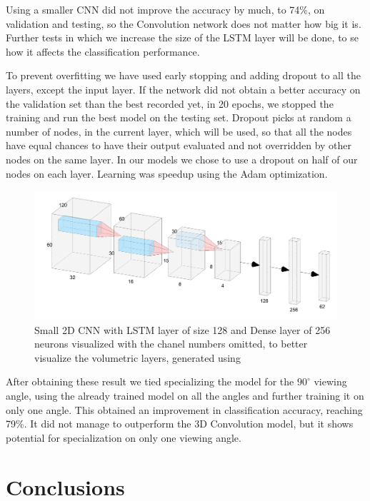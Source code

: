 \documentclass[12pt]{article}
\theoremstyle{definition}
\begin{document}
	Using a smaller CNN did not improve the accuracy by much, to 74\%, on validation and testing, so the Convolution network does not matter how big it is. Further tests in which we increase the size of the LSTM layer will be done, to se how it affects the classification performance.

	To prevent overfitting we have used early stopping and adding dropout to all the layers, except the input layer. If the network did not obtain a better accuracy on the validation set than the best recorded yet, in 20 epochs, we stopped the training and run the best model on the testing set. Dropout picks at random a number of nodes, in the current layer, which will be used, so that all the nodes have equal chances to have their output evaluated and not overridden by other nodes on the same layer. In our models we chose to use a dropout on half of our nodes on each layer. Learning was speedup using the Adam optimization.

	\begin{figure}[ht]
		\includegraphics[width=\textwidth]{networks/small-2D-CNN-LSTM-Dense.png}
		\caption{Small 2D CNN with LSTM layer of size 128 and Dense layer of 256 neurons visualized with the chanel numbers omitted, to better visualize the volumetric layers, generated using \cite{nn-svg}}
		\label{figure:small-2D-CNN-LSTM-Dense}
	\end{figure}

	After obtaining these result we tied specializing the model for the $90^\circ$ viewing angle, using the already trained model on all the angles and further training it on only one angle. This obtained an improvement in classification accuracy, reaching 79\%. It did not manage to outperform the 3D Convolution model, but it shows potential for specialization on only one viewing angle.

	\clearpage

	\section{Conclusions}
	\vspace{1cm}
\end{document}
